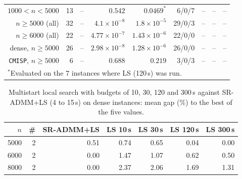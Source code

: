 \begin{table}[H]
{\begin{tabular}{rrrrrrrrr}
			$1000 < n < 5000$ & 13 & \multicolumn{1}{c}{--} & $0.542$ & $0.0469^*$ & 6/0/7 & \multicolumn{1}{c}{--} & \multicolumn{1}{c}{--} & \multicolumn{1}{c}{--} \\
			$n \ge 5000$ (all) & 32 & \multicolumn{1}{c}{--} & $4.1\times 10^{-8}$ & $1.8\times 10^{-5}$ & 29/0/3 & \multicolumn{1}{c}{--} & \multicolumn{1}{c}{--} & \multicolumn{1}{c}{--} \\
			$n \ge 6000$ (all) & 22 & \multicolumn{1}{c}{--} & $4.77\times 10^{-7}$ & $1.43\times 10^{-6}$ & 22/0/0 & \multicolumn{1}{c}{--} & \multicolumn{1}{c}{--} & \multicolumn{1}{c}{--} \\
			dense, $n \ge 5000$ & 26 & \multicolumn{1}{c}{--} & $2.98\times 10^{-8}$ & $1.28\times 10^{-6}$ & 26/0/0 & \multicolumn{1}{c}{--} & \multicolumn{1}{c}{--} & \multicolumn{1}{c}{--} \\
			\texttt{CMISP}, $n \ge 5000$ & 6 & \multicolumn{1}{c}{--} & $0.688$ & $0.219$ & 3/0/3 & \multicolumn{1}{c}{--} & \multicolumn{1}{c}{--} & \multicolumn{1}{c}{--} \\
			\bottomrule
			\multicolumn{9}{l}{\footnotesize $^*$Evaluated on the $7$ instances where LS (120\,s) was run.}
	\end{tabular}}
\end{table}

\begin{table}[H]
\centering
\footnotesize
\caption{Multistart local search with budgets of 10, 30, 120 and 300\,s against SR-ADMM+LS (4 to 15\,s) on dense instances: mean gap (\%) to the best of the five values.}
\label{tab:sweep}
\begin{tabular}{rrrrrrr}
\toprule
$n$ & \# & SR-ADMM+LS & LS 10\,s & LS 30\,s & LS 120\,s & LS 300\,s\\
\midrule
5000 & 2 & 0.51 & 0.74 & 0.65 & 0.04 & 0.00 \\
6000 & 2 & 0.00 & 1.47 & 1.07 & 0.62 & 0.50 \\
8000 & 2 & 0.00 & 2.37 & 2.06 & 1.69 & 1.31 \\
\bottomrule
\end{tabular}
\end{table}
